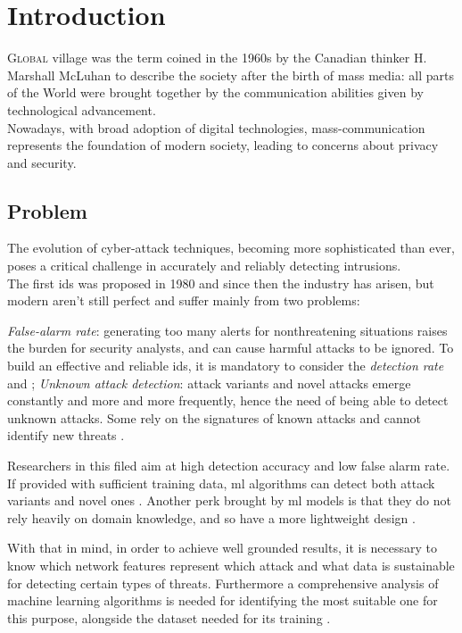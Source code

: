 \chapter{Introduction}
\label{chap:intro}

\lettrine[lines=4, findent=3pt, nindent=0pt]{G}{lobal} village was the term coined in the 1960s by the Canadian thinker H. Marshall McLuhan \cite{mcluhan1962} to describe the society after the birth of mass media: all parts of the World were brought together by the communication abilities given by technological advancement. \\
Nowadays, with broad adoption of digital technologies, mass-communication represents the foundation of modern society, leading to concerns about privacy and security.




\section{Problem}
\label{sec:problem}

The evolution of cyber-attack techniques, becoming more sophisticated than ever, poses a critical challenge in accurately and reliably detecting intrusions.\\ The first \gls{ids} was proposed in 1980 \cite{Andreson1980} and since then the industry has arisen, but modern  aren't still perfect and suffer mainly from two problems:
\begin{itemize}
    \itemAR \textit{False-alarm rate}: generating too many alerts for nonthreatening situations raises the burden for security analysts, and can cause harmful attacks to be ignored. To build an effective and reliable \gls{ids}, it is mandatory to consider the \textit{detection rate} \cite{Axelsson2000} and \cite{Liu2019};
    \itemAR \textit{Unknown attack detection}: attack variants and novel attacks emerge constantly and more and more frequently, hence the need of being able to detect unknown attacks. Some  rely on the signatures of known attacks and cannot identify new threats \cite{Hodo2017}.
\end{itemize}
Researchers in this filed aim at high detection accuracy and low false alarm rate. \\
If provided with sufficient training data, \gls{ml} algorithms can detect both attack variants and novel ones \cite{Hodo2017}. Another perk brought by \gls{ml} models is that they do not rely heavily on domain knowledge, and so have a more lightweight design \cite{Khraisat2019}. 
\par With that in mind, in order to achieve well grounded results, it is necessary to know which network features represent which attack \cite{Iglesias2015} and what data is sustainable for detecting certain types of threats. Furthermore a comprehensive analysis of machine learning algorithms is needed for identifying the most suitable one for this purpose, alongside the dataset needed for its training \cite{Sharafaldin2019}.

